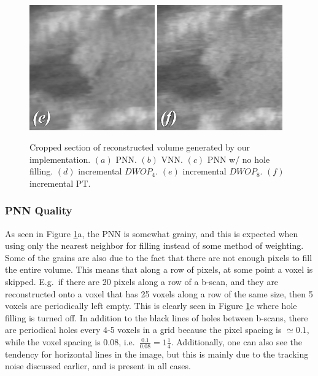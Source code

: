 \begin{figure}[h]
	\includegraphics[width=0.48\textwidth]{graphics/crop_dwop8.png}
	\includegraphics[width=0.48\textwidth]{graphics/crop_pt.png}
	\caption[Cropped section of reconstructed volume]{\small Cropped section of reconstructed volume generated by our implementation. \textbf{$(a)$} PNN. \textbf{$(b)$} VNN. \textbf{$(c)$} PNN w/ no hole filling. \textbf{$(d)$} incremental $DWOP_4$. \textbf{$(e)$} incremental $DWOP_8$. \textbf{$(f)$} incremental PT.}
	\label{fig:crops}
	\end{figure}
	
	\clearpage
	
	\subsubsection{PNN Quality} %
	
		As seen in Figure \ref{fig:crops}a, the PNN is somewhat grainy, and this is expected when using only the nearest neighbor for filling instead of some method of weighting. Some of the grains are also due to the fact that there are not enough pixels to fill the entire volume. This means that along a row of pixels, at some point a voxel is skipped. E.g.\ if there are 20 pixels along a row of a b-scan, and they are reconstructed onto a voxel that has 25 voxels along a row of the same size, then 5 voxels are periodically left empty. This is clearly seen in Figure \ref{fig:crops}c where hole filling is turned off. In addition to the black lines of holes between b-scans, there are periodical holes every 4-5 voxels in a grid because the pixel spacing is $\simeq 0.1$, while the voxel spacing is $0.08$, i.e.\ $\frac{0.1}{0.08} = 1 \frac{1}{4}$. Additionally, one can also see the tendency for horizontal lines in the image, but this is mainly due to the tracking noise discussed earlier, and is present in all cases.
	
